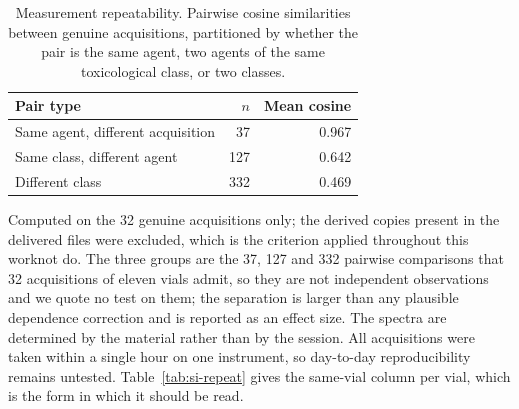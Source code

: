 \begin{table}[htbp]
\centering
\caption{Measurement repeatability. Pairwise cosine similarities between genuine acquisitions, partitioned by whether the pair is the same agent, two agents of the same toxicological class, or two classes.}
\label{tab:si-sessionsim}
\small
\begin{tabular}{lrr}
\toprule
Pair type & $n$ & Mean cosine \\
\midrule
Same agent, different acquisition & 37 & 0.967 \\
Same class, different agent & 127 & 0.642 \\
Different class & 332 & 0.469 \\
\bottomrule
\end{tabular}

\begin{flushleft}\footnotesize Computed on the 32 genuine acquisitions only; the derived copies present in the delivered files were excluded, which is the criterion applied throughout this worknot do. The three groups are the 37, 127 and 332 pairwise comparisons that 32 acquisitions of eleven vials admit, so they are not independent observations and we quote no test on them; the separation is larger than any plausible dependence correction and is reported as an effect size. The spectra are determined by the material rather than by the session. All acquisitions were taken within a single hour on one instrument, so day-to-day reproducibility remains untested. Table~\ref{tab:si-repeat} gives the same-vial column per vial, which is the form in which it should be read.\end{flushleft}
\end{table}
